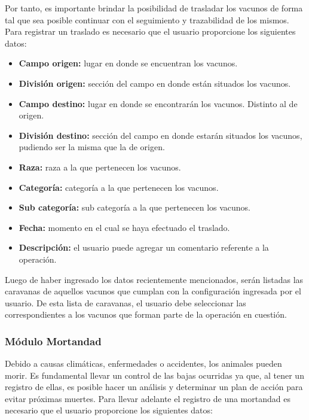 \documentclass[11pt,oneside]{book}
\begin{document}
Por tanto, es importante brindar la posibilidad de trasladar los vacunos de forma tal que sea posible continuar con el seguimiento y trazabilidad de los mismos. Para registrar un traslado es necesario que el usuario proporcione los siguientes datos:
\begin{itemize}
\item \textbf{Campo origen:} lugar en donde se encuentran los vacunos.
\item \textbf{División origen:} sección del campo en donde están situados los vacunos.
\item \textbf{Campo destino:} lugar en donde se encontrarán los vacunos. Distinto al de origen.
\item \textbf{División destino:} sección del campo en donde estarán situados los vacunos, pudiendo ser la misma que la de origen.
\item \textbf{Raza:} raza a la que pertenecen los vacunos.
\item \textbf{Categoría:} categoría a la que pertenecen los vacunos. 
\item \textbf{Sub categoría:} sub categoría a la que pertenecen los vacunos.
\item \textbf{Fecha:} momento en el cual se haya efectuado el traslado.
\item \textbf{Descripción:} el usuario puede agregar un comentario referente a la operación.
\end{itemize}

Luego de haber ingresado los datos recientemente mencionados, serán listadas las caravanas de aquellos vacunos que cumplan con la configuración ingresada por el usuario. De esta lista de caravanas, el usuario debe seleccionar las correspondientes a los vacunos que forman parte de la operación en cuestión.

\subsubsection{Módulo Mortandad}
Debido a causas climáticas, enfermedades o accidentes, los animales pueden morir. Es fundamental llevar un control de las bajas ocurridas ya que, al tener un registro de ellas, es posible hacer un análisis y determinar un plan de acción para evitar próximas muertes. Para llevar adelante el registro de una mortandad es necesario que el usuario proporcione los siguientes datos:
\end{document}
